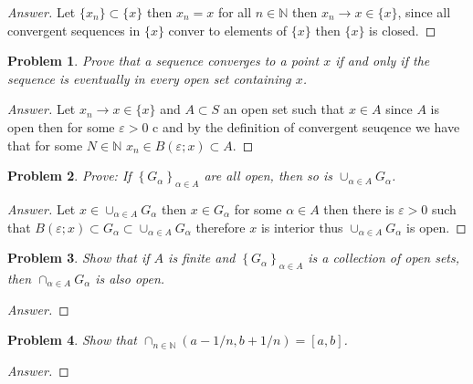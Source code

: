 \documentclass{article}
\newtheorem{problem}{Problem}[section]
\begin{document}
\begin{proof}[Answer]
    Let $\{x_n\}\subset \{x\}$ then $x_n = x$ for all $n\in \mathbb{N}$ then $x_n\to x\in \{x\}$, since all convergent sequences in $\{ x\}$ conver to elements of $\{ x\}$ then $\{ x\}$ is closed.
\end{proof}

\begin{problem}
Prove that a sequence converges to a point $x$ if and only if the sequence is eventually in every open set containing $x$.
\end{problem}

\begin{proof}[Answer]
    Let $x_n\to x\in \{x\}$ and $A\subset S$ an open set such that $x\in A$ since $A$ is open then for some $\varepsilon>0$ c and by the definition of convergent seuqence we have that for some $N\in \mathbb{N}$ $x_n\in B(\varepsilon;x)\subset A$.
\end{proof}

\begin{problem}
Prove: If $\left\{G_{\alpha}\right\}_{\alpha \in A}$ are all open, then so is $\cup_{\alpha \in A} G_{\alpha}$.
\end{problem}

\begin{proof}[Answer]
    Let $x\in \cup_{\alpha \in A} G_{\alpha}$ then $x\in G_\alpha$ for some $\alpha \in A$ then there is $\varepsilon >0 $ such that $B(\varepsilon; x)\subset G_\alpha \subset \cup_{\alpha \in A} G_{\alpha}$ therefore $x$ is interior thus $\cup_{\alpha \in A} G_{\alpha}$ is open.
\end{proof}

\begin{problem}
Show that if $A$ is finite and $\left\{G_{\alpha}\right\}_{\alpha \in A}$ is a collection of open sets, then $\cap_{\alpha \in A} G_{\alpha}$ is also open.
\end{problem}

\begin{proof}[Answer]
    
\end{proof}

\begin{problem}
Show that $\cap_{n \in \mathbb{N}}(a-1 / n, b+1 / n)=[a, b]$.
\end{problem}

\begin{proof}[Answer]
    
\end{proof}
\end{document}
